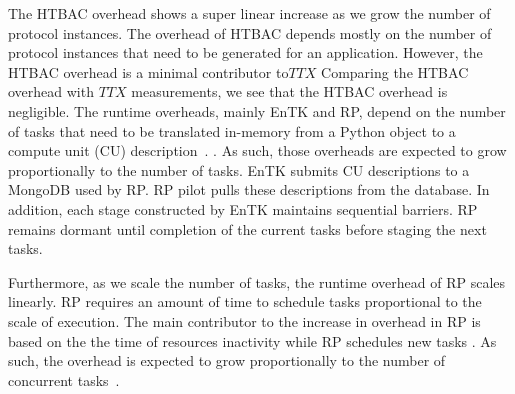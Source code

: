 The HTBAC overhead shows a super linear increase as we grow the number of 
protocol instances. 
The overhead of HTBAC depends mostly on the number of protocol instances that 
need to be generated for an application. However, the HTBAC overhead is a 
minimal contributor to\(TTX\)   
Comparing the HTBAC overhead with \(TTX\) measurements, we see that the HTBAC 
overhead is negligible. The runtime overheads, mainly EnTK and RP, depend on the
number of tasks that need to be translated in-memory from a Python object to
a compute unit (CU) description~\cite{dakka2017}. 
. As such, those
overheads are expected to grow proportionally to the number of tasks. EnTK
submits CU descriptions to a MongoDB used by RP. RP pilot pulls these
descriptions from the database.
In addition, each stage constructed by EnTK maintains sequential barriers.
 RP remains dormant until
completion of the current tasks before staging the next tasks. 


Furthermore, as we scale the number of tasks, the runtime overhead of
RP scales linearly. RP requires an amount of time to schedule tasks
proportional to the scale of execution. The main contributor to the increase
in overhead in RP  is based on the  
 the time of resources 
inactivity while RP schedules new tasks . As such, the overhead is
expected to grow proportionally to the number of concurrent 
tasks~\cite{dakka2017}. 

